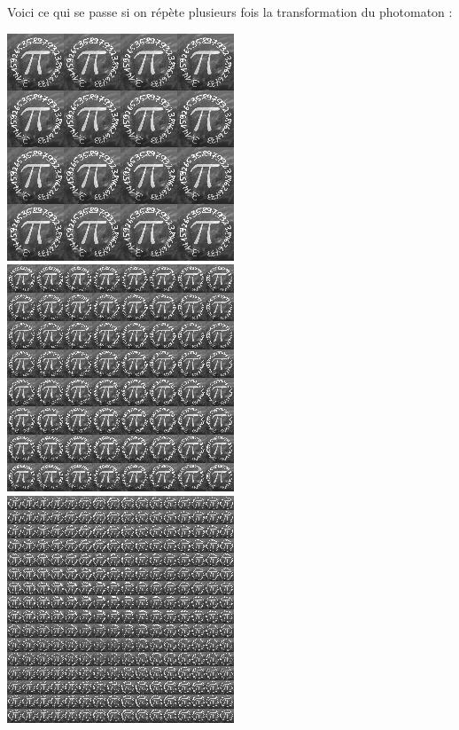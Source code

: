 \documentclass[12pt,class=report,crop=false]{standalone}
\begin{document}
Voici ce qui se passe si on répète plusieurs fois la transformation du photomaton :
\begin{center}
\includegraphics[scale=0.3]{images_fiche/pi_gimp_new_photo_2.png}\qquad
\includegraphics[scale=0.3]{images_fiche/pi_gimp_new_photo_3.png}\qquad
\includegraphics[scale=0.3]{images_fiche/pi_gimp_new_photo_4.png}
\end{center}
\end{document}
